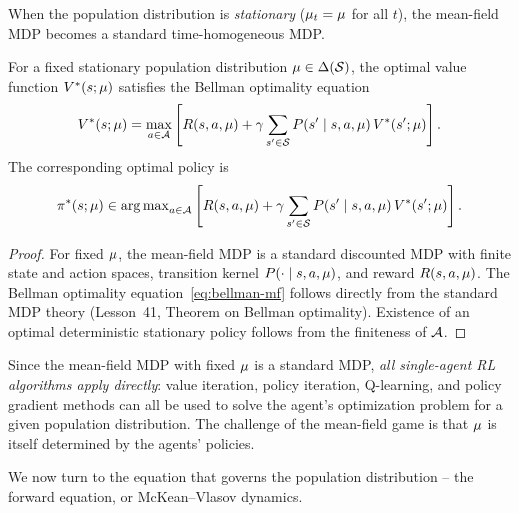 \documentclass[11pt,a4paper]{article}
\begin{document}
When the population distribution is \emph{stationary}
($\mu_t = \mu$ for all $t$), the mean-field MDP
becomes a standard time-homogeneous MDP.

\begin{proposition}
\label{prop:bellman-mf}
For a fixed stationary population distribution $\mu \in
\Delta(\mathcal{S})$, the optimal value function $V^*(s; \mu)$
satisfies the Bellman optimality equation
\begin{equation}
\label{eq:bellman-mf}
  V^*(s; \mu) = \max_{a \in \mathcal{A}}\left[
    R(s, a, \mu)
    + \gamma \sum_{s' \in \mathcal{S}}
      P(s' \mid s, a, \mu)\, V^*(s'; \mu)
  \right].
\end{equation}
The corresponding optimal policy is
\[
  \pi^*(s; \mu) \in \operatorname{arg\,max}_{a \in \mathcal{A}}\left[
    R(s, a, \mu)
    + \gamma \sum_{s' \in \mathcal{S}}
      P(s' \mid s, a, \mu)\, V^*(s'; \mu)
  \right].
\]
\end{proposition}

\begin{proof}
For fixed $\mu$, the mean-field MDP is a standard discounted
MDP with finite state and action spaces, transition kernel
$P(\cdot \mid s, a, \mu)$, and reward $R(s, a, \mu)$.
The Bellman optimality equation~\eqref{eq:bellman-mf} follows
directly from the standard MDP theory (Lesson~41, Theorem on
Bellman optimality).  Existence of an optimal deterministic
stationary policy follows from the finiteness of $\mathcal{A}$.
\end{proof}

\begin{rlconnection}[title={Mean-Field MDP as a Standard MDP}]
Since the mean-field MDP with fixed $\mu$ is a standard MDP,
\emph{all single-agent RL algorithms apply directly}: value
iteration, policy iteration, Q-learning, and policy gradient methods
can all be used to solve the agent's optimization problem for a given
population distribution.  The challenge of the mean-field game is
that $\mu$ is itself determined by the agents' policies.
\end{rlconnection}

We now turn to the equation that governs the population distribution
-- the forward equation, or McKean--Vlasov dynamics.


\end{document}
